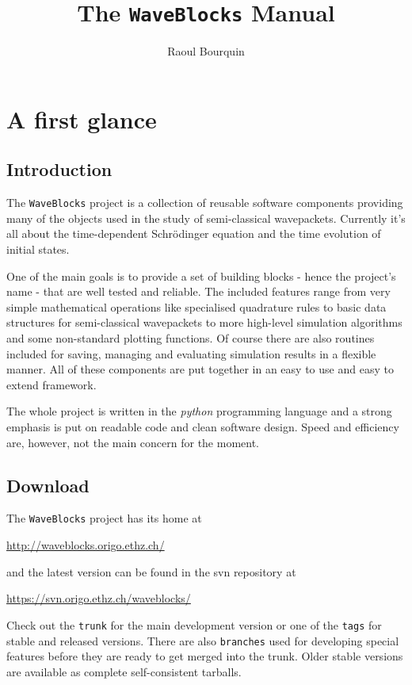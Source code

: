 \documentclass[a4paper,10pt]{report}
\title{The \texttt{WaveBlocks} Manual}
\author{Raoul Bourquin}
\begin{document}
\maketitle


\tableofcontents

\chapter{A first glance}

\section{Introduction}

The \texttt{WaveBlocks} project is a collection of reusable software components
providing many of the objects used in the study of semi-classical wavepackets.
Currently it's all about the time-dependent Schrödinger equation and the time
evolution of initial states.

One of the main goals is to provide a set of building blocks - hence the project's
name - that are well tested and reliable. The included features range from very
simple mathematical operations like specialised quadrature rules to basic data
structures for semi-classical wavepackets to more high-level simulation algorithms
and some non-standard plotting functions. Of course there are also routines
included for saving, managing and evaluating simulation results in a flexible
manner. All of these components are put together in an easy to use and easy
to extend framework.

The whole project is written in the \emph{python} programming language and a 
strong emphasis is put on readable code and clean software design. Speed and
efficiency are, however, not the main concern for the moment.

\section{Download}

The \texttt{WaveBlocks} project has its home at
\begin{center}
  \url{http://waveblocks.origo.ethz.ch/}
\end{center}
and the latest version can be found in the svn repository at
\begin{center}
  \url{https://svn.origo.ethz.ch/waveblocks/}
\end{center}
Check out the \texttt{trunk} for the main development version or
one of the \texttt{tags} for stable and released versions. There
are also \texttt{branches} used for developing special features
before they are ready to get merged into the trunk. Older stable
versions are available as complete self-consistent tarballs.
\end{document}

